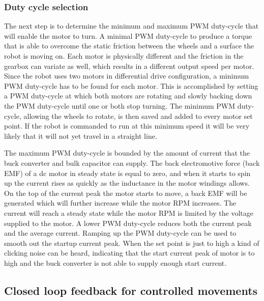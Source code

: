 \subsubsection{Duty cycle selection}

The next step is to determine the minimum and maximum PWM duty-cycle that will enable the motor to turn.
A minimal PWM duty-cycle to produce a torque that is able to overcome the static friction between the wheels and a surface the robot is moving on.
Each motor is physically different and the friction in the gearbox can variate as well, which results in a different output speed per motor.
Since the robot uses two motors in differential drive configuration, a minimum PWM duty-cycle has to be found for each motor.
This is accomplished by setting a PWM duty-cycle at which both motors are rotating and slowly backing down the PWM duty-cycle until one or both stop turning.
The minimum PWM duty-cycle, allowing the wheels to rotate, is then saved and added to every motor set point.
If the robot is commanded to run at this minimum speed it will be very likely that it will not yet travel in a straight line.


The maximum PWM duty-cycle is bounded by the amount of current that the buck converter and bulk capacitor can supply.
The back electromotive force (back EMF) of a dc motor in steady state is equal to zero, and when it starts to spin up the current rises as quickly as the inductance in the motor windings allows. 
On the top of the current peak the motor starts to move, a back EMF will be generated which will further increase while the motor RPM increases.
The current will reach a steady state while the motor RPM is limited by the voltage supplied to the motor.
A lower PWM duty-cycle reduces both the current peak and the average current.
Ramping up the PWM duty-cycle can be used to smooth out the startup current peak.
When the set point is just to high a kind of clicking noise can be heard, indicating that the start current peak of motor is to high and the buck converter is not able to supply enough start current.

\subsection{Closed loop feedback for controlled movements}

